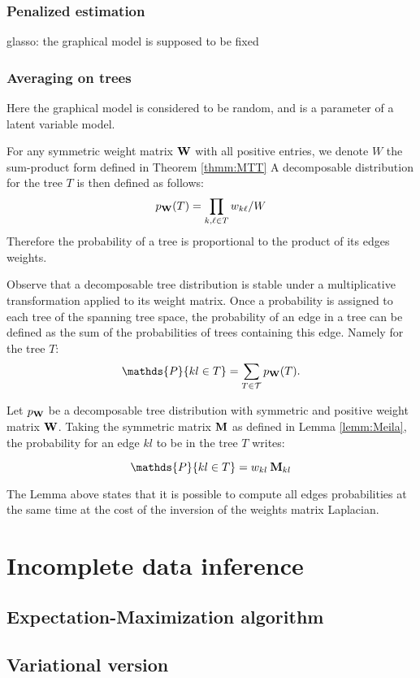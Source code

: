  \subsubsection{Penalized estimation}
 glasso: the graphical model is supposed to be fixed
 \subsubsection{Averaging on trees}
 Here the graphical model is considered to be random, and is a  parameter of a latent variable model.
\begin{definition}
For any symmetric weight matrix ${\bf W}$ with all positive entries, we denote $W$ the sum-product form defined in Theorem \ref{thmm:MTT} A decomposable  distribution for the tree $T$ is then defined as follows:
$$p_{{\bf W}}(T) = \prod_{k,\ell \in T} w_{k\ell} / W $$
Therefore the probability of a tree is proportional to the product of its edges weights.
\end{definition}
Observe that a decomposable tree distribution is stable under a multiplicative transformation applied to its weight matrix. Once a probability is assigned to each tree of the spanning tree space, the probability of an edge in a tree can be defined as the sum of the probabilities of trees containing this edge. Namely for the tree $T$:
$$\mathds{P}\{kl\in T\} = \sum_{T\in \mathcal{T}} p_{\Wbf}(T).$$

\begin{lemma}  \label{lem:Kirshner}
    Let $p_{{\bf W}}$ be a decomposable tree distribution with symmetric and positive weight matrix ${\bf W}$. Taking the symmetric matrix ${\bf M}$ as defined in Lemma  \ref{lemm:Meila}, the probability for an edge $kl$ to be in the tree $T$ writes:
 
$$\mathds{P}\{kl\in T\} =  w_{kl}\: \Mbf_{kl}$$
\end{lemma}
The Lemma above states that it is possible to compute all edges probabilities at the same time at the cost of the inversion of the weights matrix Laplacian.
\section{Incomplete data inference}

 \subsection{Expectation-Maximization algorithm}
 
 \subsection{Variational version}
  